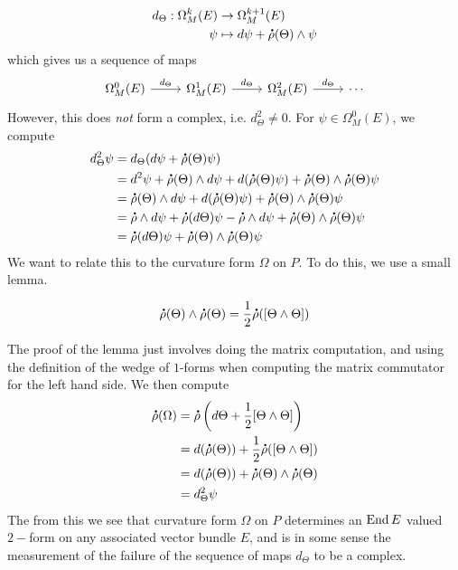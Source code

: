 %
\begin{align*}
d_\Theta : \Omega^k_M(E) &\to \Omega^{k+1}_M(E) \\
\psi &\mapsto d\psi + \accentset{\mbox{\large\bfseries .}}{\rho}(\Theta) \wedge \psi
\end{align*}
%
which gives us a sequence of maps
\[\begin{tikzcd}
\Omega^0_M(E) \ar[r, "d_\Theta"] & \Omega^1_M(E) \ar[r, "d_\Theta"]
& \Omega^2_M(E) \ar[r, "d_\Theta"]  & \cdots
\end{tikzcd}\]
However, this does \emph{not} form a complex, i.e. $d_\Theta^2 \neq 0$. For
$\psi \in \Omega^0_M(E)$, we compute
%
\begin{align*}
d_\Theta^2\psi &= d_\Theta(d\psi + \accentset{\mbox{\large\bfseries .}}{\rho}(\Theta)\psi) \\
&= d^2\psi + \accentset{\mbox{\large\bfseries .}}{\rho}(\Theta) \wedge d\psi + d(\accentset{\mbox{\large\bfseries .}}{\rho}(\Theta)\psi)
+ \accentset{\mbox{\large\bfseries .}}{\rho}(\Theta) \wedge \accentset{\mbox{\large\bfseries .}}{\rho}(\Theta)\psi \\
&= \accentset{\mbox{\large\bfseries .}}{\rho}(\Theta) \wedge d\psi + d(\accentset{\mbox{\large\bfseries .}}{\rho}(\Theta)\psi)
+ \accentset{\mbox{\large\bfseries .}}{\rho}(\Theta) \wedge \accentset{\mbox{\large\bfseries .}}{\rho}(\Theta)\psi \\
&= \accentset{\mbox{\large\bfseries .}}{\rho} \wedge d\psi + \accentset{\mbox{\large\bfseries .}}{\rho}(d\Theta)\psi - \accentset{\mbox{\large\bfseries .}}{\rho} \wedge d\psi
+ \accentset{\mbox{\large\bfseries .}}{\rho}(\Theta) \wedge \accentset{\mbox{\large\bfseries .}}{\rho}(\Theta)\psi \\
&= \accentset{\mbox{\large\bfseries .}}{\rho}(d\Theta)\psi + \accentset{\mbox{\large\bfseries .}}{\rho}(\Theta) \wedge \accentset{\mbox{\large\bfseries .}}{\rho}(\Theta)\psi
\end{align*}
%
We want to relate this to the curvature form $\Omega$ on $P$. To do this, we use a
small lemma.
%
\begin{lem}
\[
\accentset{\mbox{\large\bfseries .}}{\rho}(\Theta) \wedge \accentset{\mbox{\large\bfseries .}}{\rho}(\Theta) = \frac{1}{2}\accentset{\mbox{\large\bfseries .}}{\rho}([\Theta \wedge \Theta])
\]
\end{lem}
%
The proof of the lemma just involves doing the matrix computation, and using the
definition of the wedge of $1$-forms when computing the matrix commutator
for the left hand side. We then compute
\begin{align*}
\accentset{\mbox{\large\bfseries .}}{\rho}(\Omega) &= \accentset{\mbox{\large\bfseries .}}{\rho}\left(d\Theta + \frac{1}{2}[\Theta \wedge \Theta]\right) \\
&= d(\accentset{\mbox{\large\bfseries .}}{\rho}(\Theta)) + \frac{1}{2}\accentset{\mbox{\large\bfseries .}}{\rho}([\Theta \wedge \Theta]) \\
&= d(\accentset{\mbox{\large\bfseries .}}{\rho}(\Theta)) + \accentset{\mbox{\large\bfseries .}}{\rho}(\Theta) \wedge \accentset{\mbox{\large\bfseries .}}{\rho}(\Theta) \\
&= d^2_\Theta\psi
\end{align*}
%
The from this we see that curvature form $\Omega$ on $P$ determines an $\operatorname{End} E$ valued
$2-$form on any associated vector bundle $E$, and is in some sense the measurement
of the failure of the sequence of maps $d_\Theta$ to be a complex.
